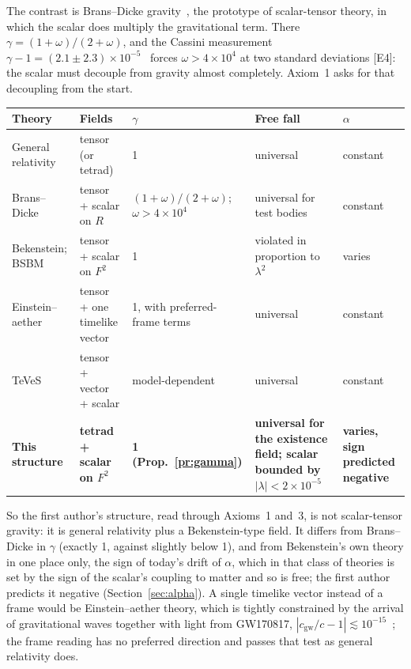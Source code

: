 \documentclass[11pt,a4paper]{article}
\theoremstyle{definition}
\theoremstyle{remark}
\newcommand{\chk}[1]{\textsf{[#1]}}
\begin{document}
\noindent The contrast is Brans--Dicke gravity~\cite{bd}, the prototype of scalar-tensor theory, in which the scalar does multiply the
gravitational term. There $\gamma=(1+\omega)/(2+\omega)$, and the Cassini measurement $\gamma-1=(2.1\pm2.3)\times10^{-5}$~\cite{cassini}
forces $\omega>4\times10^{4}$ at two standard deviations \chk{E4}: the scalar must decouple from gravity almost completely. Axiom~1 asks for
that decoupling from the start.

\begin{center}\small
\begin{tabularx}{\linewidth}{@{}lLLLL@{}}
\toprule
Theory & Fields & $\gamma$ & Free fall & $\alpha$ \\
\midrule
General relativity & tensor (or tetrad) & 1 & universal & constant \\
Brans--Dicke~\cite{bd} & tensor + scalar on $R$ & $(1+\omega)/(2+\omega)$; $\omega>4\times10^4$ & universal for test bodies & constant \\
Bekenstein; BSBM~\cite{bekenstein82,bsbm} & tensor + scalar on $F^2$ & 1 & violated in proportion to $\lambda^2$ & varies \\
Einstein--aether~\cite{aether} & tensor + one timelike vector & 1, with preferred-frame terms & universal & constant \\
TeVeS~\cite{teves} & tensor + vector + scalar & model-dependent & universal & constant \\
\textbf{This structure} & \textbf{tetrad + scalar on $F^2$} & \textbf{1 (Prop.~\ref{pr:gamma})} & \textbf{universal for the existence
field; scalar bounded by $|\lambda|<2\times10^{-5}$} & \textbf{varies, sign predicted negative} \\
\bottomrule
\end{tabularx}
\end{center}

\noindent So the first author's structure, read through Axioms~1 and~3, is not scalar-tensor gravity: it is general relativity plus a
Bekenstein-type field. It differs from Brans--Dicke in $\gamma$ (exactly 1, against slightly below 1), and from Bekenstein's own theory in one
place only, the sign of today's drift of $\alpha$, which in that class of theories is set by the sign of the scalar's coupling to matter
and so is free; the first author predicts it negative (Section~\ref{sec:alpha}). A single timelike vector instead of a frame would be
Einstein--aether theory, which is tightly constrained by the arrival of gravitational waves together with light from GW170817,
$|c_{\text{gw}}/c-1|\lesssim10^{-15}$~\cite{gw170817}; the frame reading has no preferred direction and passes that test as general
relativity does.
\end{document}
